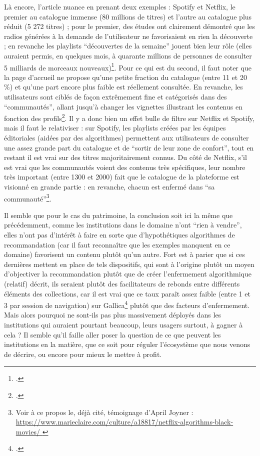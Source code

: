 Là encore, l’article nuance en prenant deux exemples : Spotify et Netflix, le premier au catalogue immense (80 millions de titres) et l’autre au catalogue plus réduit (5 272 titres) ; pour le premier, des études ont clairement démontré que les radios générées à la demande de l’utilisateur ne favorisaient en rien la découverte ; en revanche les playlists \enquote{découvertes de la semaine} jouent bien leur rôle (elles auraient permis, en quelques mois, à quarante millions de personnes de consulter 5 milliards de morceaux nouveaux)\footcite[§ 2]{durand_chapitre_2016-1}. Pour ce qui est du second, il faut noter que la page d’accueil ne propose qu’une petite fraction du catalogue (entre 11 et 20 \%) et qu’une part encore plus faible est réellement consultée. En revanche, les utilisateurs sont ciblés de façon extrêmement fine et catégorisés dans des \enquote{communautés}, allant jusqu’à changer les vignettes illustrant les contenus en fonction des profils\footcite{noauthor_algorithmes_nodate}. Il y a donc bien un effet bulle de filtre sur Netflix et Spotify, mais il faut le relativiser : sur Spotify, les playlists créées par les équipes éditoriales (aidées par des algorithmes) permettent aux utilisateurs de consulter une assez grande part du catalogue et de \enquote{sortir de leur zone de confort}, tout en restant il est vrai sur des titres majoritairement connus. Du côté de Netflix, s’il est vrai que les communautés voient des contenus très spécifiques, leur nombre très important (entre 1300 et 2000) fait que le catalogue de la plateforme est visionné en grande partie : en revanche, chacun est enfermé dans \enquote{sa communauté}\footnote{Voir à ce propos le, déjà cité, témoignage d'April Joyner : \url{https://www.marieclaire.com/culture/a18817/netflix-algorithms-black-movies/ }}.

Il semble que pour le cas du patrimoine, la conclusion soit ici la même que précédemment, comme les institutions dans le domaine n’ont \enquote{rien à vendre}, elles n’ont pas d’intérêt à faire en sorte que d’hypothétiques algorithmes de recommandation (car il faut reconnaître que les exemples manquent en ce domaine) favorisent un contenu plutôt qu’un autre. Fort est à parier que si ces dernières mettent en place de tels dispositifs, qui sont à l’origine plutôt un moyen d’objectiver la recommandation plutôt que de créer l’enfermement algorithmique (relatif) décrit, ils seraient plutôt des facilitateurs de rebonds entre différents éléments des collections, car il est vrai que ce taux paraît assez faible (entre 1 et 3 par session de navigation) sur Gallica\footcite{bastard2023} plutôt que des facteurs d’enfermement. Mais alors pourquoi ne sont-ils pas plus massivement déployés dans les institutions qui auraient pourtant beaucoup, leurs usagers surtout, à gagner à cela ? Il semble qu’il faille aller poser la question de ce que peuvent les institutions en la matière, que ce soit pour réguler l’écosystème que nous venons de décrire, ou encore pour mieux le mettre à profit.

